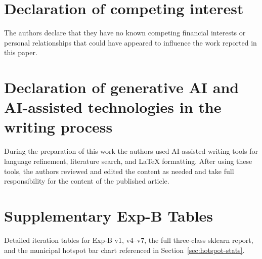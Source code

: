 \documentclass[preprint,12pt,times,numbers]{elsarticle}
\begin{document}
\section*{Declaration of competing interest}

The authors declare that they have no known competing financial interests or personal relationships that could have appeared to influence the work reported in this paper.

\section*{Declaration of generative AI and AI-assisted technologies in the writing process}

During the preparation of this work the authors used AI-assisted writing tools for language refinement, literature search, and \LaTeX{} formatting. After using these tools, the authors reviewed and edited the content as needed and take full responsibility for the content of the published article.

\appendix
\section{Supplementary Exp-B Tables}
\label{app:exp-b}

Detailed iteration tables for Exp-B v1, v4--v7, the full three-class sklearn report, and the municipal hotspot bar chart referenced in Section~\ref{sec:hotspot-stats}.





\end{document}

